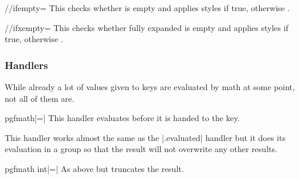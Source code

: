 \begin{multicols}{2}
\begin{key}{/\utilsext/ifempty=}
  This checks whether  is empty and applies styles  if true,
  otherwise .
\end{key}
\begin{key}{/\utilsext/ifxempty=}
  This checks whether fully expanded  is empty and applies styles  if true,
  otherwise .
\end{key}

\subsubsection{Handlers}

While already a lot of values given to keys are evaluated by \pgfname math at some point,
not all of them are.

\begin{ext_handler}{{pgfmath}|=|}
  This handler evaluates  before it is handed to the key.
  
  This handler works almost the same as the |.evaluated|
  handler but it does its evaluation in a group so that the result will 
  not overwrite any other results.
\end{ext_handler}

\begin{ext_handler}{{pgfmath int}|=|}
  As above but truncates the result.
\end{ext_handler}



\end{multicols}
